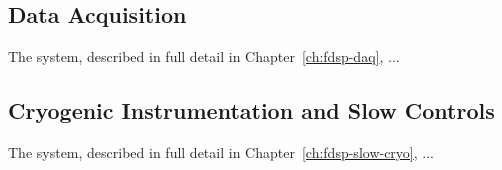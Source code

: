 \subsection{Data Acquisition}
\label{sec:fdsp-ov-daq}

The  system, described in full detail in Chapter~\ref{ch:fdsp-daq}, ...
\subsection{Cryogenic Instrumentation and Slow Controls}
\label{sec:fdsp-ov-instr}

The  system, described in full detail in Chapter~\ref{ch:fdsp-slow-cryo}, ...





